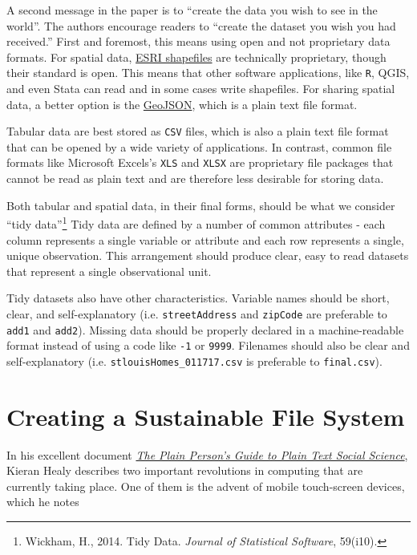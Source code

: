 \documentclass[]{book}
\let\rmarkdownfootnote\footnote%
\def\footnote{\protect\rmarkdownfootnote}
\theoremstyle{definition}
\theoremstyle{definition}
\theoremstyle{remark}
\begin{document}
A second message in the paper is to ``create the data you wish to see in
the world''. The authors encourage readers to ``create the dataset you
wish you had received.'' First and foremost, this means using open and
not proprietary data formats. For spatial data,
\href{https://en.wikipedia.org/wiki/Shapefile}{ESRI shapefiles} are
technically proprietary, though their standard is open. This means that
other software applications, like \texttt{R}, QGIS, and even Stata can
read and in some cases write shapefiles. For sharing spatial data, a
better option is the
\href{https://en.wikipedia.org/wiki/GeoJSON}{GeoJSON}, which is a plain
text file format.

Tabular data are best stored as \texttt{CSV} files, which is also a
plain text file format that can be opened by a wide variety of
applications. In contrast, common file formats like Microsoft Excels's
\texttt{XLS} and \texttt{XLSX} are proprietary file packages that cannot
be read as plain text and are therefore less desirable for storing data.

Both tabular and spatial data, in their final forms, should be what we
consider ``tidy data''\footnote{Wickham, H., 2014. Tidy Data.
  \emph{Journal of Statistical Software}, 59(i10).} Tidy data are
defined by a number of common attributes - each column represents a
single variable or attribute and each row represents a single, unique
observation. This arrangement should produce clear, easy to read
datasets that represent a single observational unit.

Tidy datasets also have other characteristics. Variable names should be
short, clear, and self-explanatory (i.e. \texttt{streetAddress} and
\texttt{zipCode} are preferable to \texttt{add1} and \texttt{add2}).
Missing data should be properly declared in a machine-readable format
instead of using a code like \texttt{-1} or \texttt{9999}. Filenames
should also be clear and self-explanatory (i.e.
\texttt{stlouisHomes\_011717.csv} is preferable to \texttt{final.csv}).

\section{Creating a Sustainable File
System}\label{creating-a-sustainable-file-system}

In his excellent document \href{http://plain-text.co}{\emph{The Plain
Person's Guide to Plain Text Social Science}}, Kieran Healy describes
two important revolutions in computing that are currently taking place.
One of them is the advent of mobile touch-screen devices, which he notes
\end{document}
